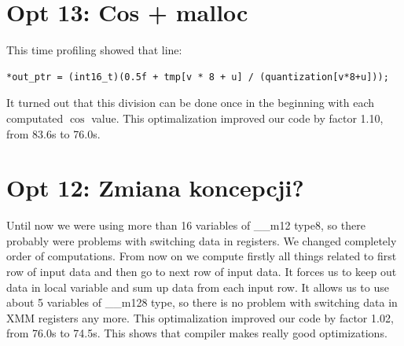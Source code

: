 \documentclass[11pt]{article}
\begin{document}
\section{Opt 13: Cos + malloc}
This time profiling showed that line:
\begin{lstlisting}
*out_ptr = (int16_t)(0.5f + tmp[v * 8 + u] / (quantization[v*8+u]));
\end{lstlisting}
It turned out that this division can be done once in the beginning
with each computated $\cos$ value. This optimalization improved
our code by factor 1.10, from 83.6s to 76.0s.


\section{Opt 12: Zmiana koncepcji?}
Until now we were using more than 16 variables of \_\_m12 type8,
so there probably were problems with switching data in registers.
We changed completely order of computations. From now on we compute
firstly all things related to first row of input data and then go
to next row of input data. It forces us to keep out data in local
variable and sum up data from each input row. It allows us to use
about 5 variables of \_\_m128 type, so there is no problem with
switching data in XMM registers any more. This optimalization
improved our code by factor 1.02, from 76.0s to 74.5s. This shows
that compiler makes really good optimizations.
\end{document}
